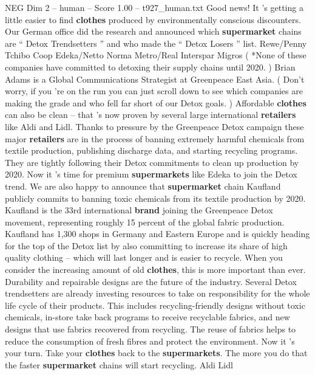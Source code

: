 \begin{textsample}{NEG Dim 2 – human – Score 1.00 – t927\_human.txt}  \label{ex:f2_neg_031}
Good news!
It ’s getting a little easier to find \textbf{clothes} produced by environmentally conscious discounters.
Our German office did the research and announced which \textbf{supermarket} chains are “ Detox Trendsetters ” and who made the “ Detox Losers ” list.
Rewe/Penny Tchibo Coop Edeka/Netto Norma Metro/Real Interspar Migros ( *None of these companies have committed to detoxing their supply chains until 2020. ) Brian Adams is a Global Communications Strategist at Greenpeace East Asia. ( Don't worry, if you ’re on the run you can just scroll down to see which companies are making the grade and who fell far short of our Detox goals. ) Affordable \textbf{clothes} can also be clean – that ’s now proven by several large international \textbf{retailers} like Aldi and Lidl.
Thanks to pressure by the Greenpeace Detox campaign these major \textbf{retailers} are in the process of banning extremely harmful chemicals from textile production, publishing discharge data, and starting recycling programs.
They are tightly following their Detox commitments to clean up production by 2020.
Now it ’s time for premium \textbf{supermarkets} like Edeka to join the Detox trend.
We are also happy to announce that \textbf{supermarket} chain Kaufland publicly commits to banning toxic chemicals from its textile production by 2020.
Kaufland is the 33rd international \textbf{brand} joining the Greenpeace Detox movement, representing roughly 15 percent of the global fabric production.
Kaufland has 1,300 shops in Germany and Eastern Europe and is quickly heading for the top of the Detox list by also committing to increase its share of high quality clothing – which will last longer and is easier to recycle.
When you consider the increasing amount of old \textbf{clothes}, this is more important than ever.
Durability and repairable designs are the future of the industry.
Several Detox trendsetters are already investing resources to take on responsibility for the whole life cycle of their products.
This includes recycling-friendly designs without toxic chemicals, in-store take back programs to receive recyclable fabrics, and new designs that use fabrics recovered from recycling.
The reuse of fabrics helps to reduce the consumption of fresh fibres and protect the environment.
Now it ’s your turn.
Take your \textbf{clothes} back to the \textbf{supermarkets}.
The more you do that the faster \textbf{supermarket} chains will start recycling.
Aldi Lidl

\end{textsample}
